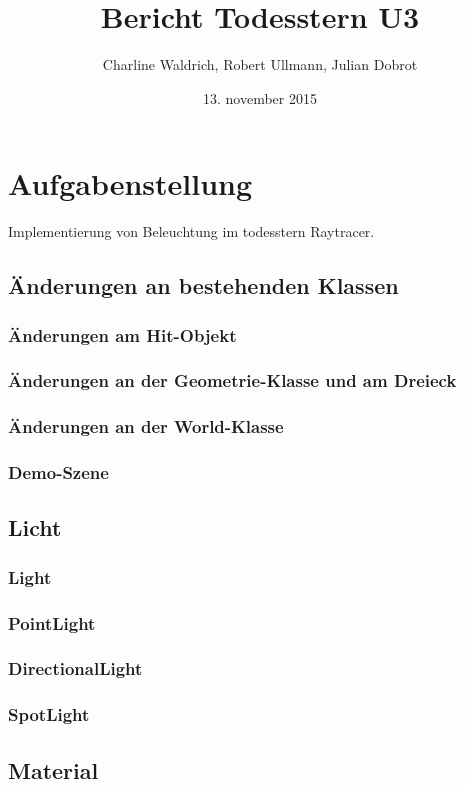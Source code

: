 \documentclass[14pt]{extarticle}
\title{Bericht Todesstern U3}
\author{Charline Waldrich, Robert Ullmann, Julian Dobrot}
\date{13. november 2015}
\begin{document}
\maketitle
\pagebreak
\tableofcontents


\section{Aufgabenstellung}
Implementierung von Beleuchtung im todesstern Raytracer.
\subsection{Änderungen an bestehenden Klassen}
\subsubsection{Änderungen am Hit-Objekt}
\subsubsection{Änderungen an der Geometrie-Klasse und am Dreieck}
\subsubsection{Änderungen an der World-Klasse}
\subsubsection{Demo-Szene}

\subsection{Licht}
\subsubsection{Light}
\subsubsection{PointLight}
\subsubsection{DirectionalLight}
\subsubsection{SpotLight}

\subsection{Material}
\end{document}
